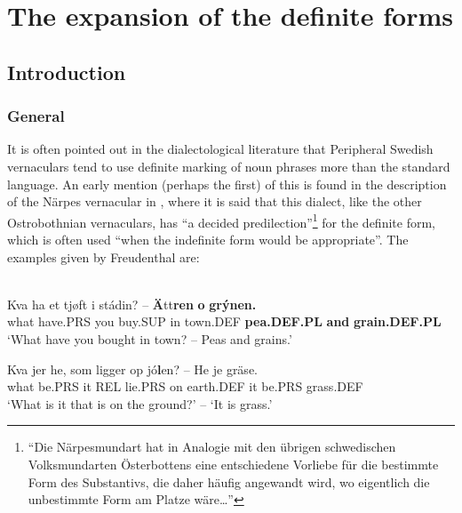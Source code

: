 \newcommand{\textstyleLinguisticExample}[1]{\emph{#1}}
\newcommand{\gl}{}
\newcommand{\textstyleBodyTextFirstChar}{}
\newcommand{\textstyleBodytextCChar}{}


\chapter{The expansion of the definite forms}
\label{bkm:Ref155077895}\label{bkm:Ref156803843}\label{bkm:Ref160007852}\section{ Introduction}
\subsection{ General}

It is often pointed out in the dialectological literature that Peripheral Swedish vernaculars tend to use definite marking of noun phrases more than the standard language. An early mention (perhaps the first) of this is found in the description of the Närpes vernacular in \citet[137]{Freudenthal1878}, where it is said that this dialect, like the other Ostrobothnian vernaculars, has “a decided predilection”\footnote{ “Die Närpesmundart hat in Analogie mit den übrigen schwedischen Volksmundarten Österbottens eine entschiedene Vorliebe für die bestimmte Form des Substantivs, die daher häufig angewandt wird, wo eigentlich die unbestimmte Form am Platze wäre…”} for the definite form, which is often used “when the indefinite form would be appropriate”. The examples given by Freudenthal are:



\ea\label{}
\\
	\ea
		\gll	Kva ha et  tjøft  i  stádin?  --  \textbf{Ä}tt\textbf{ren} \textbf{o} \textbf{grýnen.}\\
				what have.PRS you  buy.SUP  in  town.DEF    \textbf{pea.DEF.PL} \textbf{and} \textbf{grain.DEF.PL}\\
		\glt 	‘What have you bought in town? – Peas and grains.’

	\ex
		\gll	Kva  jer  he,  som  ligger  op  jó\textbf{l}en?  --  He  je  gräse.\\
				what  be.PRS  it  REL  lie.PRS  on  earth.DEF    it  be.PRS  grass.DEF\\
		\glt 	‘What is it that is on the ground?’ – ‘It is grass.’

